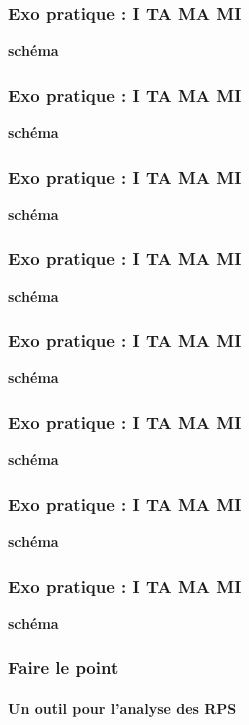 \documentclass{beamer}
\begin{document}
\begin{frame}
\frametitle{Exo pratique : I TA MA MI}

\textbf{schéma}
\end{frame}

\begin{frame}
\frametitle{Exo pratique : I TA MA MI}

\textbf{schéma}
\end{frame}

\begin{frame}
\frametitle{Exo pratique : I TA MA MI}

\textbf{schéma}
\end{frame}

\begin{frame}
\frametitle{Exo pratique : I TA MA MI}

\textbf{schéma}
\end{frame}

\begin{frame}
\frametitle{Exo pratique : I TA MA MI}

\textbf{schéma}
\end{frame}

\begin{frame}
\frametitle{Exo pratique : I TA MA MI}

\textbf{schéma}
\end{frame}

\begin{frame}
\frametitle{Exo pratique : I TA MA MI}

\textbf{schéma}
\end{frame}

\begin{frame}
\frametitle{Exo pratique : I TA MA MI}

\textbf{schéma}
\end{frame}

\begin{frame}
\frametitle{Faire le point}
\framesubtitle{Un outil pour l'analyse des RPS}

\end{frame}
\end{document}
